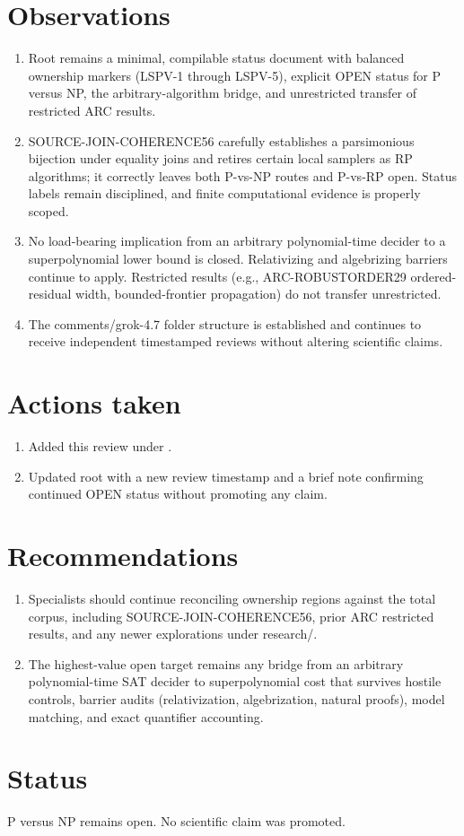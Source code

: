 \documentclass[11pt]{article}
\begin{document}
\section{Observations}
\begin{enumerate}
\item Root  remains a minimal, compilable status document with balanced ownership markers (LSPV-1 through LSPV-5), explicit OPEN status for P versus NP, the arbitrary-algorithm bridge, and unrestricted transfer of restricted ARC results.
\item SOURCE-JOIN-COHERENCE56 carefully establishes a parsimonious bijection under equality joins and retires certain local samplers as RP algorithms; it correctly leaves both P-vs-NP routes and P-vs-RP open. Status labels remain disciplined, and finite computational evidence is properly scoped.
\item No load-bearing implication from an arbitrary polynomial-time decider to a superpolynomial lower bound is closed. Relativizing and algebrizing barriers continue to apply. Restricted results (e.g., ARC-ROBUSTORDER29 ordered-residual width, bounded-frontier propagation) do not transfer unrestricted.
\item The comments/grok-4.7 folder structure is established and continues to receive independent timestamped reviews without altering scientific claims.
\end{enumerate}

\section{Actions taken}
\begin{enumerate}
\item Added this review under .
\item Updated root  with a new review timestamp and a brief note confirming continued OPEN status without promoting any claim.
\end{enumerate}

\section{Recommendations}
\begin{enumerate}
\item Specialists should continue reconciling ownership regions against the total corpus, including SOURCE-JOIN-COHERENCE56, prior ARC restricted results, and any newer explorations under research/.
\item The highest-value open target remains any bridge from an arbitrary polynomial-time SAT decider to superpolynomial cost that survives hostile controls, barrier audits (relativization, algebrization, natural proofs), model matching, and exact quantifier accounting.
\end{enumerate}

\section{Status}
P versus NP remains open. No scientific claim was promoted.

\end{document}
